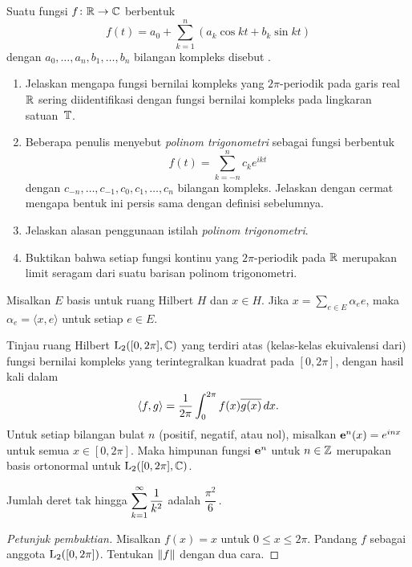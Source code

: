 \begin{exer} Suatu fungsi $f\colon \mathbb{R} \rightarrow \mathbb{C}$ berbentuk
   \[ f(t) = a_0 + \sum_{k=1}^n (a_k \cos kt + b_k \sin kt) \]
dengan $a_0, \dots, a_n, b_1, \dots, b_n$ bilangan kompleks disebut
.
 \begin{enumerate}
  \item Jelaskan mengapa fungsi bernilai kompleks yang $2\pi$-periodik pada garis real $\mathbb{R}$
sering diidentifikasi dengan fungsi bernilai kompleks pada lingkaran satuan~$\mathbb{T}$.
  \item Beberapa penulis menyebut \emph{polinom trigonometri} sebagai fungsi berbentuk
    \[ f(t) = \sum_{k=-n}^n c_k e^{ikt} \]
 dengan $c_{-n}, \dots, c_{-1}, c_0, c_1, \dots, c_n$ bilangan kompleks. Jelaskan dengan cermat mengapa bentuk ini persis
sama dengan definisi sebelumnya.
  \item Jelaskan alasan penggunaan istilah \emph{polinom trigonometri}.
  \item Buktikan bahwa setiap fungsi kontinu yang $2\pi$-periodik pada $\mathbb{R}$ merupakan limit seragam
dari suatu barisan polinom trigonometri.
 \end{enumerate}
\end{exer}

\begin{prop}\label{prop_unique_onbasis} Misalkan $E$ basis untuk ruang Hilbert $H$ dan $x \in H$.
Jika $x = \sum_{e \in E} \alpha_e e$, maka $\alpha_e = \langle x,e \rangle$ untuk setiap $e \in E$.
\end{prop}

\begin{prop} Tinjau ruang Hilbert $\mathrm{L_{2}}([0,2\pi],\mathbb{C})$ yang terdiri atas (kelas-kelas ekuivalensi dari) fungsi
bernilai kompleks yang terintegralkan kuadrat pada $[0,2\pi]$, dengan hasil kali dalam
  \[ \langle f,g \rangle = \frac1{2\pi}\int_0^{2\pi} f(x) \overline{g(x)}\,dx. \]
Untuk setiap bilangan bulat $n$ (positif, negatif, atau nol), misalkan $\mathbf{e}^n(x) = e^{inx}$ untuk semua $x
\in [0,2\pi]$. Maka himpunan fungsi $\mathbf{e}^n$ untuk $n \in \mathbb{Z}$ merupakan
basis ortonormal untuk $\mathrm{L_{2}}([0,2\pi],\mathbb{C})$.
\end{prop}

\begin{exam} Jumlah deret tak hingga $\displaystyle\sum_{k=1}^\infty \frac1{k^2}$ adalah $\dfrac{\pi^2}6$\,.
\end{exam}

\begin{proof}[\emph{Petunjuk pembuktian}] Misalkan $f(x) = x$ untuk $0 \le x \le 2\pi$. Pandang $f$ sebagai anggota
$\mathrm{L_{2}}([0,2\pi])$. Tentukan $\lVert f\rVert$ dengan dua cara. \ns
\end{proof}

